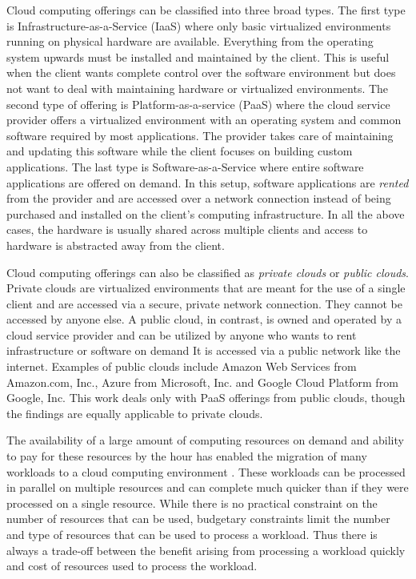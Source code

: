 \documentclass[12pt]{report}
\begin{document}
Cloud computing offerings can be classified into three broad types.
The first type is Infrastructure-as-a-Service (IaaS) where only basic virtualized environments running on physical hardware are available.
Everything from the operating system upwards must be installed and maintained by the client.
This is useful when the client wants complete control over the software environment but does not want to deal with maintaining hardware or virtualized environments.
The second type of offering is Platform-as-a-service (PaaS) where the cloud service provider offers a virtualized environment with an operating system and common software required by most applications.
The provider takes care of maintaining and updating this software while the client focuses on building custom applications.
The last type is Software-as-a-Service where entire software applications are offered on demand.
In this setup, software applications are \textit{rented} from the provider and are accessed over a network connection instead of being purchased and installed on the client's computing infrastructure.
In all the above cases, the hardware is usually shared across multiple clients and access to hardware is abstracted away from the client.

Cloud computing offerings can also be classified as \textit{private clouds} or \textit{public clouds}.
Private clouds are virtualized environments that are meant for the use of a single client and are accessed via a secure, private network connection.
They cannot be accessed by anyone else.
A public cloud, in contrast, is owned and operated by a cloud service provider and can be utilized by anyone who wants to rent infrastructure or software on demand
It is accessed via a public network like the internet.
Examples of public clouds include Amazon Web Services from Amazon.com, Inc., Azure from Microsoft, Inc. and Google Cloud Platform from Google, Inc.
This work deals only with PaaS offerings from public clouds, though the findings are equally applicable to private clouds.

The availability of a large amount of computing resources on demand and ability to pay for these resources by the hour has enabled the migration of many workloads to a cloud computing environment \cite{RightScale:2015}.
These workloads can be processed in parallel on multiple resources and can complete much quicker than if they were processed on a single resource.
While there is no practical constraint on the number of resources that can be used, budgetary constraints limit the number and type of resources that can be used to process a workload.
Thus there is always a trade-off between the benefit arising from processing a workload quickly and cost of resources used to process the workload.
\end{document}
